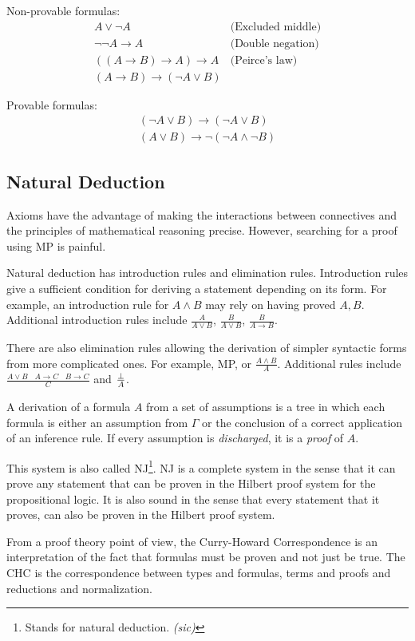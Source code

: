 Non-provable formulas:
\[
\begin{array}{cc}
A \vee \neg A  & \text{(Excluded middle)} \\
\neg \neg A \to A & \text{(Double negation)} \\
((A \to B) \to A) \to A & \text{(Peirce's law)} \\
(A \to B) \to (\neg A \vee B) & 
\end{array}
\]

Provable formulas:
\[
\begin{array}{c}
(\neg A \vee B) \to (\neg A \vee B) \\
(A \vee B) \to \neg (\neg A \wedge \neg B)
\end{array}
\]

\subsection{Natural Deduction}
Axioms have the advantage of making the interactions between connectives and the principles
of mathematical reasoning precise. However, searching for a proof using MP is painful.

Natural deduction has introduction rules and elimination rules. Introduction rules give
 a sufficient condition for deriving a statement depending on its form.
For example, an introduction rule for $A \wedge B$ may rely on having proved $A, B$.
Additional introduction rules include $\frac{A}{A\vee B}$, $\frac{B}{A\vee B}$,
$\frac{B}{A\to B}$.

There are also elimination rules allowing the derivation of simpler syntactic forms
from more complicated ones. For example, MP, or $\frac{A\wedge B}{A}$.
Additional rules include $\frac{A\vee B~~~~A\to C~~~~B\to C}{C}$ and $\frac{\perp}{A}$.

A derivation of a formula $A$ from a set of assumptions is a
tree in which each formula is either an assumption from $\Gamma$ or
the conclusion of a correct application of an inference rule. If every assumption
is \emph{discharged}, it is a \emph{proof} of $A$.

This system is also called NJ\footnote{Stands for natural deduction. \emph{(sic)}}. NJ is a complete system
in the sense that it can prove any statement that can be proven in the Hilbert proof system
for the propositional logic. It is also sound in the sense that every statement that it proves,
can also be proven in the Hilbert proof system.

From a proof theory point of view, the Curry-Howard Correspondence is an
interpretation of the fact that formulas
must be proven and not just be true. The CHC is the correspondence between
types and formulas, terms and proofs and reductions and normalization.

